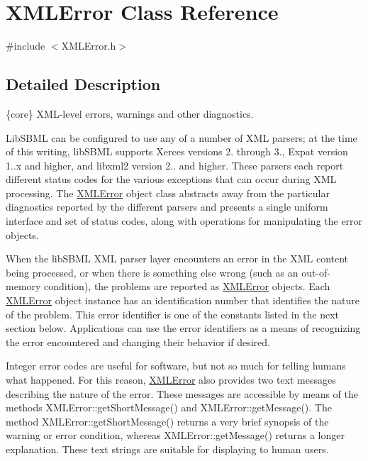 \hypertarget{class_x_m_l_error}{}\section{X\+M\+L\+Error Class Reference}
\label{class_x_m_l_error}


{\ttfamily \#include $<$X\+M\+L\+Error.\+h$>$}



\subsection{Detailed Description}
\{core\} X\+M\+L-\/level errors, warnings and other diagnostics.



Lib\+S\+B\+ML can be configured to use any of a number of X\+ML parsers; at the time of this writing, lib\+S\+B\+ML supports Xerces versions 2. through 3., Expat version 1..\+x and higher, and libxml2 version 2.. and higher. These parsers each report different status codes for the various exceptions that can occur during X\+ML processing. The \hyperlink{class_x_m_l_error}{X\+M\+L\+Error} object class abstracts away from the particular diagnostics reported by the different parsers and presents a single uniform interface and set of status codes, along with operations for manipulating the error objects.

When the lib\+S\+B\+ML X\+ML parser layer encounters an error in the X\+ML content being processed, or when there is something else wrong (such as an out-\/of-\/memory condition), the problems are reported as \hyperlink{class_x_m_l_error}{X\+M\+L\+Error} objects. Each \hyperlink{class_x_m_l_error}{X\+M\+L\+Error} object instance has an identification number that identifies the nature of the problem. This error identifier is one of the constants listed in the next section below. Applications can use the error identifiers as a means of recognizing the error encountered and changing their behavior if desired.

Integer error codes are useful for software, but not so much for telling humans what happened. For this reason, \hyperlink{class_x_m_l_error}{X\+M\+L\+Error} also provides two text messages describing the nature of the error. These messages are accessible by means of the methods X\+M\+L\+Error\+::get\+Short\+Message() and X\+M\+L\+Error\+::get\+Message(). The method X\+M\+L\+Error\+::get\+Short\+Message() returns a very brief synopsis of the warning or error condition, whereas X\+M\+L\+Error\+::get\+Message() returns a longer explanation. These text strings are suitable for displaying to human users.


